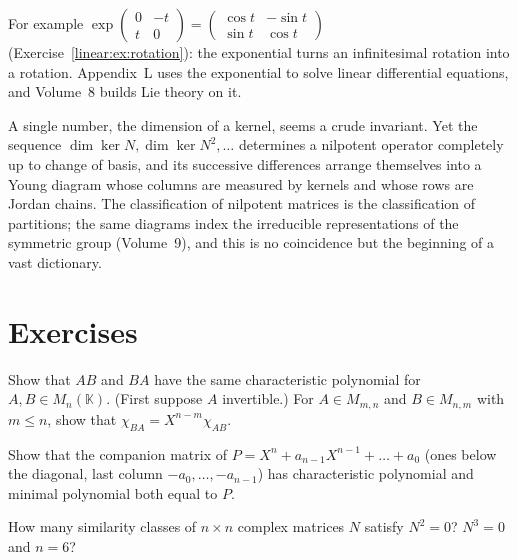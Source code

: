 For example $\exp\begin{pmatrix}0&-t\\t&0\end{pmatrix}=\begin{pmatrix}\cos t&-\sin t\\\sin t&\cos t\end{pmatrix}$
(Exercise~\ref{linear:ex:rotation}): the exponential turns an infinitesimal rotation into a rotation. Appendix~L uses the
exponential to solve linear differential equations, and Volume~8 builds Lie theory on it.

\begin{beauty}
A single number, the dimension of a kernel, seems a crude invariant. Yet the sequence $\dim\ker N,\dim\ker N^2,\dots$
determines a nilpotent operator completely up to change of basis, and its successive differences arrange themselves into a
Young diagram whose columns are measured by kernels and whose rows are Jordan chains. The classification of nilpotent
matrices is the classification of partitions; the same diagrams index the irreducible representations of the symmetric
group (Volume~9), and this is no coincidence but the beginning of a vast dictionary.
\end{beauty}

\section{Exercises}

\begin{exercise}[$\star$]\label{linear:ex:abba}
Show that $AB$ and $BA$ have the same characteristic polynomial for $A,B\in M_n(\mathbb K)$. (First suppose $A$ invertible.)
For $A\in M_{m,n}$ and $B\in M_{n,m}$ with $m\le n$, show that $\chi_{BA}=X^{n-m}\chi_{AB}$.
\end{exercise}

\begin{exercise}[$\star$]\label{linear:ex:companion}
Show that the companion matrix of $P=X^n+a_{n-1}X^{n-1}+\dots+a_0$ (ones below the diagonal, last column
$-a_0,\dots,-a_{n-1}$) has characteristic polynomial and minimal polynomial both equal to $P$.
\end{exercise}

\begin{exercise}[$\star$]\label{linear:ex:nilcount}
How many similarity classes of $n\times n$ complex matrices $N$ satisfy $N^2=0$? $N^3=0$ and $n=6$?
\end{exercise}

